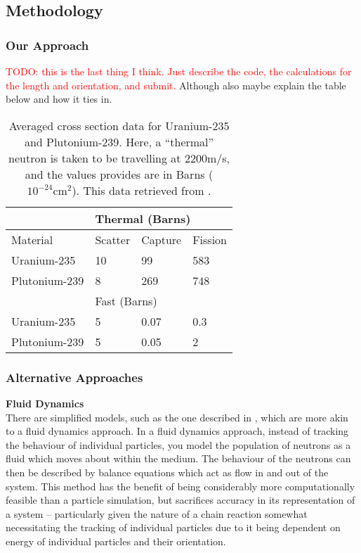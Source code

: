 \subsection{Methodology}

\subsubsection{Our Approach}

\textcolor{red}{TODO: this is the last thing I think. Just describe the code, the calculations for the length and orientation, and submit.}
Although also maybe explain the table below and how it ties in.
\begin{table}[h!]
    \centering
    \begin{tabular}{l|lll|}
    \cline{2-4}
                                        & \multicolumn{3}{l|}{Thermal (Barns)} \\ \hline
    \multicolumn{1}{|l|}{Material} & \multicolumn{1}{l|}{Scatter} & \multicolumn{1}{l|}{Capture} & Fission \\ \hline
    \multicolumn{1}{|l|}{Uranium-235}   & 10        & 99          & 583        \\ \cline{1-1}
    \multicolumn{1}{|l|}{Plutonium-239} & 8         & 269         & 748        \\ \hline
    \multicolumn{1}{|l|}{}              & \multicolumn{3}{l|}{Fast (Barns)}    \\ \hline
    \multicolumn{1}{|l|}{Uranium-235}   & 5         & 0.07        & 0.3        \\ \cline{1-1}
    \multicolumn{1}{|l|}{Plutonium-239} & 5         & 0.05        & 2          \\ \hline
    \end{tabular}
    \caption{Averaged cross section data for Uranium-235 and Plutonium-239. Here, a ``thermal'' neutron is taken to be travelling at $2200$m/s, 
    and the values provides are in Barns ($10^{-24} \text{cm}^2$). This data retrieved from \cite{collision-kernel-data}.}
\end{table}


\subsubsection{Alternative Approaches}

\noindent \textbf{Fluid Dynamics} \\
There are simplified models, such as the one described in \cite{los-alamos-primer}, which are more akin to a fluid dynamics approach. 
In a fluid dynamics approach, instead of tracking the behaviour of individual particles, you model the population of neutrons as a fluid 
which moves about within the medium. The behaviour of the neutrons can then be described by balance equations which act as flow in and out 
of the system. This method has the benefit of being considerably more computationally feasible than a particle simulation, but sacrifices accuracy 
in its representation of a system -- particularly given the nature of a chain reaction somewhat necessitating the tracking of individual particles due 
to it being dependent on energy of individual particles and their orientation.

